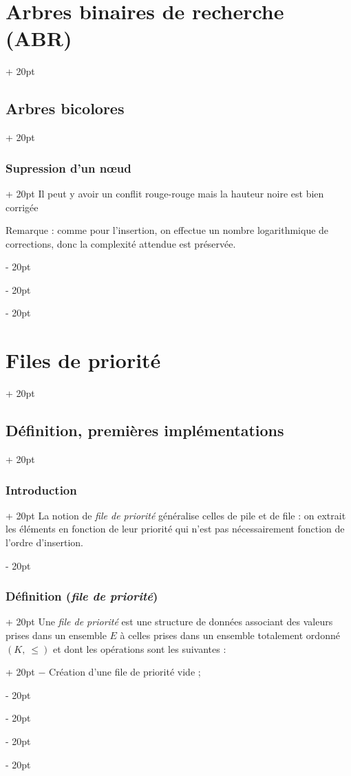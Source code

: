 \documentclass[a4paper, 12pt, twoside]{article}
\renewcommand{\le}{\leqslant}
\newcommand{\ind}[1][20pt]{\advance\leftskip + #1}
\newcommand{\deind}[1][20pt]{\advance\leftskip - #1}
\newenvironment{indt}[2][20pt]{#2 \par \ind[#1]}{\par \deind} %
\begin{document}
\begin{indt}{\section{Arbres binaires de recherche (ABR)}}
\begin{indt}{\subsection{Arbres bicolores}}
\begin{indt}{\subsubsection{Supression d'un n\oe ud}}
                Il peut y avoir un conflit rouge-rouge mais la hauteur noire est bien corrigée
                
                \vspace{12pt}
                
                Remarque : comme pour l'insertion, on effectue un nombre logarithmique de corrections, donc la complexité attendue est préservée.
            \end{indt}
        \end{indt}
        
    \end{indt}
    
    \vspace{12pt}
    
    \begin{indt}{\section{Files de priorité}}
        
        \begin{indt}{\subsection{Définition, premières implémentations}}
            \begin{indt}{\subsubsection{Introduction}}
                La notion de \textit{file de priorité} généralise celles de pile et de file : on extrait les éléments en fonction de leur priorité qui n'est pas nécessairement fonction de l'ordre d'insertion.
            \end{indt}
            
            \vspace{12pt}
            
            \begin{indt}{\subsubsection{Définition (\textit{file de priorité})}}
                \begin{indt}{Une \textit{file de priorité} est une structure de données associant des valeurs prises dans un ensemble $E$ à celles prises dans un ensemble totalement ordonné $(K,\ \le)$ et dont les opérations sont les suivantes :}
                    $-$ Création d'une file de priorité vide ;
                    

\end{indt}
\end{indt}
\end{indt}
\end{indt}
\end{document}

